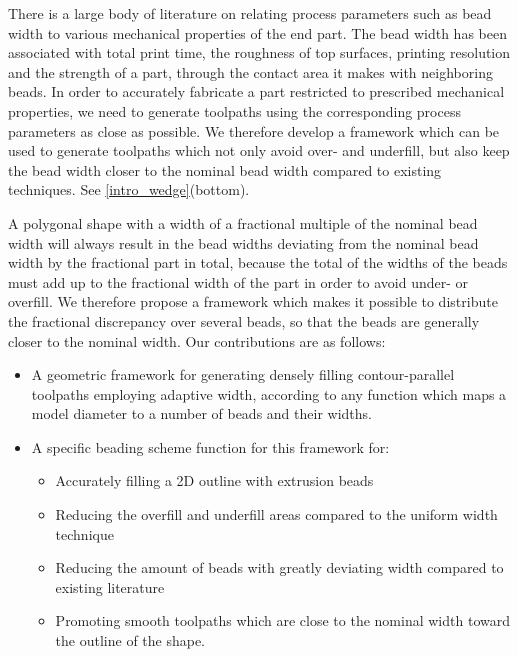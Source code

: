 There is a large body of literature on relating process parameters such as bead width to various mechanical properties of the end part.
The bead width has been associated with total print time, the roughness of top surfaces, printing resolution and the strength of a part, through the contact area it makes with neighboring beads. \cite{N.Turner2014,ahn2002anisotropic}
In order to accurately fabricate a part restricted to prescribed mechanical properties, we need to generate toolpaths using the corresponding process parameters as close as possible.
We therefore develop a framework which can be used to generate toolpaths which not only avoid over- and underfill, but also keep the bead width closer to the nominal bead width compared to existing techniques.
See \cref{intro_wedge}(bottom).

A polygonal shape with a width of a fractional multiple of the nominal bead width will always result in the bead widths deviating from the nominal bead width by the fractional part in total,
because the total of the widths of the beads must add up to the fractional width of the part in order to avoid under- or overfill.
We therefore propose a framework which makes it possible to distribute the fractional discrepancy over several beads, so that the beads are generally closer to the nominal width.
Our contributions are as follows:
\begin{itemize}
\item A geometric framework for generating densely filling contour-parallel toolpaths employing adaptive width, according to any function which maps a model diameter to a number of beads and their widths.
\item A specific beading scheme function for this framework for:
\begin{itemize}
\item Accurately filling a 2D outline with extrusion beads
\item Reducing the overfill and underfill areas compared to the uniform width technique
\item Reducing the amount of beads with greatly deviating width compared to existing literature
\item Promoting smooth toolpaths which are close to the nominal width toward the outline of the shape.
\end{itemize}
\end{itemize}




